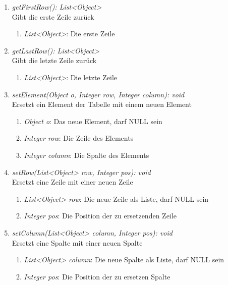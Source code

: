 \begin{enumerate}[+]
	\item \textit{getFirstRow(): List<Object>} \\
	Gibt die erste Zeile zurück
	\vspace{-0.2cm}
	\begin{enumerate}[$\circ$]
		\item \textit{List<Object>}: Die erste Zeile
	\end{enumerate}
	
	\item \textit{getLastRow(): List<Object>} \\
	Gibt die letzte Zeile zurück
	\vspace{-0.2cm}
	\begin{enumerate}[$\circ$]
		\item \textit{List<Object>}: Die letzte Zeile
	\end{enumerate}
	
	\item \textit{setElement(Object o, Integer row, Integer column): void} \\
	Ersetzt ein Element der Tabelle mit einem neuen Element
	\begin{enumerate}[$\bullet$]
		\item \textit{Object o}: Das neue Element, darf NULL sein
		\item \textit{Integer row}: Die Zeile des Elements
		\item \textit{Integer column}: Die Spalte des Elements
	\end{enumerate}
	\vspace{-0.2cm}
	
	\item \textit{setRow(List<Object> row, Integer pos): void} \\
	Ersetzt eine Zeile mit einer neuen Zeile
	\begin{enumerate}[$\bullet$]
		\item \textit{List<Object> row}: Die neue Zeile als Liste, darf NULL sein
		\item \textit{Integer pos}: Die Position der zu ersetzenden Zeile
	\end{enumerate}
	\vspace{-0.2cm}
	
	\item \textit{setColumn(List<Object> column, Integer pos): void} \\
	Ersetzt eine Spalte mit einer neuen Spalte
	\begin{enumerate}[$\bullet$]
		\item \textit{List<Object> column}: Die neue Spalte als Liste, darf NULL sein
		\item \textit{Integer pos}: Die Position der zu ersetzen Spalte
	\end{enumerate}
	\vspace{-0.2cm}
	

\end{enumerate}
